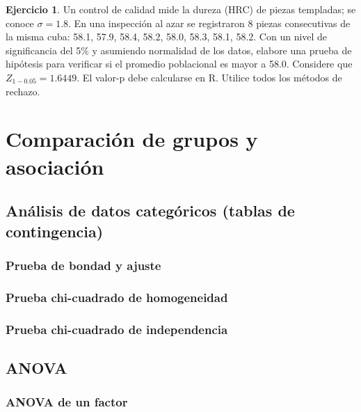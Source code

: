 \documentclass[
  11pt,
]{book}
\theoremstyle{definition}
\theoremstyle{definition}
\theoremstyle{definition}
\newtheorem{exercise}{Ejercicio}[chapter]
\theoremstyle{definition}
\theoremstyle{remark}
\begin{document}
\begin{exercise}
Un control de calidad mide la dureza (HRC) de piezas templadas; se conoce \(\sigma=1.8\). En una inspección al azar se registraron 8 piezas consecutivas de la misma cuba: 58.1, 57.9, 58.4, 58.2, 58.0, 58.3, 58.1, 58.2. Con un nivel de significancia del 5\% y asumiendo normalidad de los datos, elabore una prueba de hipótesis para verificar si el promedio poblacional es mayor a 58.0. Considere que \(Z_{1-0.05}=1.6449\). El valor-p debe calcularse en R. Utilice todos los métodos de rechazo.
\end{exercise}

\chapter{Comparación de grupos y asociación}\label{comparaciuxf3n-de-grupos-y-asociaciuxf3n}

\section{Análisis de datos categóricos (tablas de contingencia)}\label{anuxe1lisis-de-datos-categuxf3ricos-tablas-de-contingencia}

\subsection{Prueba de bondad y ajuste}\label{prueba-de-bondad-y-ajuste}

\subsection{Prueba chi-cuadrado de homogeneidad}\label{prueba-chi-cuadrado-de-homogeneidad}

\subsection{Prueba chi-cuadrado de independencia}\label{prueba-chi-cuadrado-de-independencia}

\section{ANOVA}\label{anova}

\subsection{ANOVA de un factor}\label{anova-de-un-factor}
\end{document}
